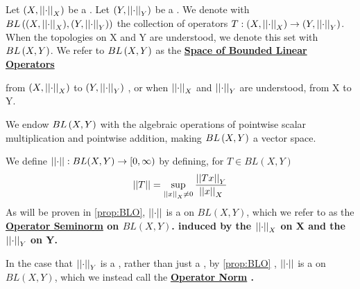\label{def:BLO} 
\newcommand{\SpaceOfBoundedLinearOperators}[0]{ 
    \bf \hyperref[def:BLO]{Space of Bounded Linear Operators} \rm
}
\newcommand{\OperatorSeminorm}[0]{
    \bf \hyperref[def:BLO]{Operator Seminorm} \rm
}
\newcommand{\OperatorNorm}[0]{
    \bf \hyperref[def:BLO]{Operator Norm} \rm
}
\begin{df}
Let $(X,\left|\left| \cdot \right|\right|_X)$ be a \NonDegenerate \SeminormedSpace.
Let $(Y, \left|\left| \cdot \right|\right|_Y)$ be a \SeminormedSpace.
We denote with $BL\left( (X,\left|\left| \cdot \right|\right|_X), (Y, \left|\left| \cdot \right|\right|_Y)\right)$ 
the collection of
\ContinuousFunction
\Linear
operators
$T:(X, \left|\left| \cdot \right|\right|_X) \to (Y, \left|\left| \cdot \right|\right|_Y)$. 
When the topologies on X and Y are understood, we denote this set with
$BL\left( X,Y\right)$. 
We refer to $BL\left( X,Y\right)$ as the \SpaceOfBoundedLinearOperators 
from $(X, \left|\left| \cdot \right|\right|_X)$ to $(Y, \left|\left| \cdot \right|\right|_Y)$ 
, or when $\left|\left| \cdot \right|\right|_X$ and $\left|\left| \cdot \right|\right|_Y$ are understood, 
from X to Y. 

We endow $BL\left( X,Y\right)$ with the algebraic operations
of pointwise scalar multiplication
and pointwise addition, making $BL\left( X,Y\right)$ a vector space. 

We define $\left|\left| \cdot \right|\right|:BL(X,Y) \to [0,\infty)$ by defining, 
for $T \in BL(X,Y)$
\begin{equation}
    \left|\left| T \right|\right| = \sup\limits_{\left|\left| x \right|\right|_X \neq 0} \frac{\left|\left| Tx \right|\right|_Y}{\left|\left| x \right|\right|_X}
\end{equation}
As will be proven in \ref{prop:BLO}, $\left|\left| \cdot \right|\right|$ is a \Seminorm on $BL(X,Y)$, which 
we refer to as the \OperatorSeminorm on $BL(X,Y)$. induced by the
\Seminorm $\left|\left| \cdot \right|\right|_X$ on X and the \Seminorm $\left|\left| \cdot \right|\right|_Y$ on Y. 

In the case that $\left|\left| \cdot \right|\right|_{Y}$ is a \Norm, rather than just a \Seminorm, by \ref{prop:BLO}
, $\left|\left| \cdot \right|\right|$ is a \Norm on $BL(X,Y)$, which we instead call the \OperatorNorm. 
\end{df}

